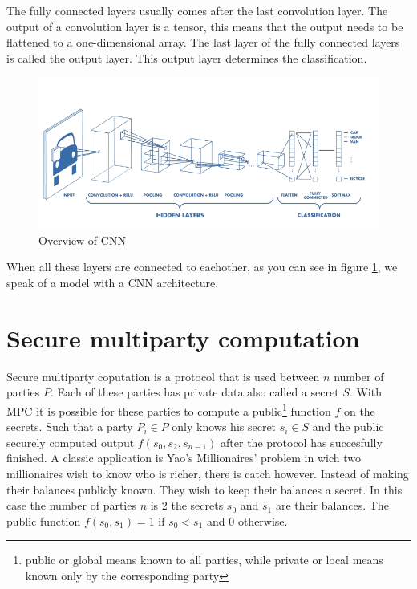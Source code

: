 The fully connected layers usually comes after the last convolution layer. The output of a convolution layer is a tensor, this means that the output needs to be flattened to a one-dimensional array. The last layer of the fully connected layers is called the output layer. This output layer determines the classification.\\

\begin{figure}[H]
  \includegraphics[width=\linewidth]{fig/cnn.png}
  \caption{Overview of CNN}
  \label{fig:cnn}
\end{figure}

When all these layers are connected to eachother, as you can see in figure \ref{fig:cnn}, we speak of a model with a CNN architecture.

\section{Secure multiparty computation}
Secure multiparty coputation is a protocol that is used between $n$ number of parties $P$. Each of these parties has private data also called a secret $S$. With MPC it is possible for these parties to compute a public\footnote{public or global means known to all parties, while private or local means known only by the corresponding party} function $f$ on the secrets. Such that a party $P_i \in P$ only knows his secret $s_i \in S$ and the public securely computed output $f(s_0,s_2,s_{n-1})$ after the protocol has succesfully finished.
\newline
A classic application is Yao's Millionaires' problem \cite{yao1982protocols} in wich two millionaires wish to know who is richer, there is catch however. Instead of making their balances publicly known. They wish to keep their balances a secret. In this case the number of parties $n$ is 2 the secrets $s_0$ and $s_1$ are their balances. The public function $f(s_0,s_1)=1$ if $s_0<s_1$ and $0$ otherwise.

